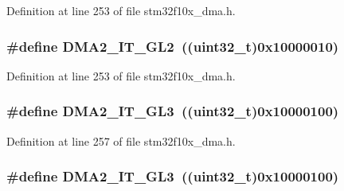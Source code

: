 Definition at line 253 of file stm32f10x\+\_\+dma.\+h.

\subsubsection[{\texorpdfstring{D\+M\+A2\+\_\+\+I\+T\+\_\+\+G\+L2}{DMA2_IT_GL2}}]{\setlength{\rightskip}{0pt plus 5cm}\#define D\+M\+A2\+\_\+\+I\+T\+\_\+\+G\+L2~(({\bf uint32\+\_\+t})0x10000010)}\hypertarget{group___d_m_a__interrupts__definition_gad1b225f7053b88eeee62e5ed1801b5c3}{}\label{group___d_m_a__interrupts__definition_gad1b225f7053b88eeee62e5ed1801b5c3}


Definition at line 253 of file stm32f10x\+\_\+dma.\+h.

\subsubsection[{\texorpdfstring{D\+M\+A2\+\_\+\+I\+T\+\_\+\+G\+L3}{DMA2_IT_GL3}}]{\setlength{\rightskip}{0pt plus 5cm}\#define D\+M\+A2\+\_\+\+I\+T\+\_\+\+G\+L3~(({\bf uint32\+\_\+t})0x10000100)}\hypertarget{group___d_m_a__interrupts__definition_ga9876a20bc7ae5ccff6d4e62a8b767070}{}\label{group___d_m_a__interrupts__definition_ga9876a20bc7ae5ccff6d4e62a8b767070}


Definition at line 257 of file stm32f10x\+\_\+dma.\+h.

\subsubsection[{\texorpdfstring{D\+M\+A2\+\_\+\+I\+T\+\_\+\+G\+L3}{DMA2_IT_GL3}}]{\setlength{\rightskip}{0pt plus 5cm}\#define D\+M\+A2\+\_\+\+I\+T\+\_\+\+G\+L3~(({\bf uint32\+\_\+t})0x10000100)}\hypertarget{group___d_m_a__interrupts__definition_ga9876a20bc7ae5ccff6d4e62a8b767070}{}\label{group___d_m_a__interrupts__definition_ga9876a20bc7ae5ccff6d4e62a8b767070}


